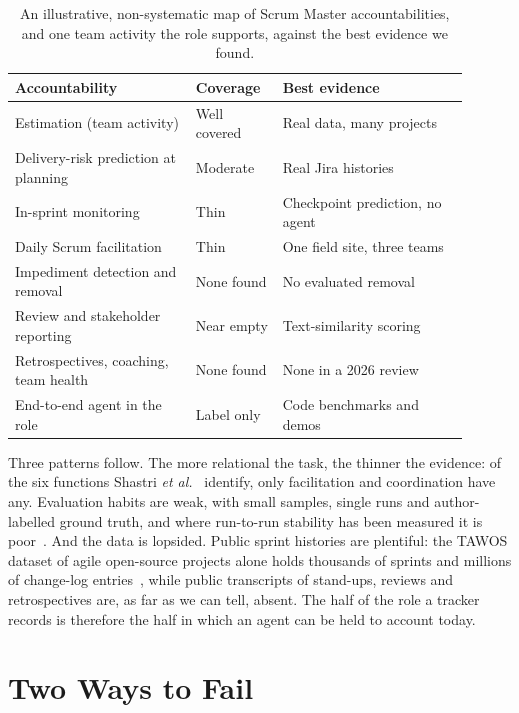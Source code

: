 \documentclass[conference]{IEEEtran}
\begin{document}
\begin{table}[t]
\centering\footnotesize
\caption{An illustrative, non-systematic map of Scrum Master accountabilities, and one team activity the role supports, against the best evidence we found.}
\label{tab:gap}
\setlength{\tabcolsep}{3pt}
\begin{tabular}{>{\raggedright\arraybackslash}p{0.36\linewidth} >{\raggedright\arraybackslash}p{0.17\linewidth} >{\raggedright\arraybackslash}p{0.37\linewidth}}
\hline
Accountability & Coverage & Best evidence\\
\hline
Estimation (team activity) & Well covered & Real data, many projects~\cite{deepse}\\
Delivery-risk prediction at planning & Moderate & Real Jira histories~\cite{tse2018,sprint2vec}\\
In-sprint monitoring & Thin & Checkpoint prediction, no agent~\cite{tse2018}\\
Daily Scrum facilitation & Thin & One field site, three teams~\cite{cabrero}\\
Impediment detection and removal & None found & No evaluated removal\\
Review and stakeholder reporting & Near empty & Text-similarity scoring~\cite{alliata}\\
Retrospectives, coaching, team health & None found & None in a 2026 review~\cite{peras}\\
End-to-end agent in the role & Label only & Code benchmarks and demos~\cite{agilecoder}\\
\hline
\end{tabular}
\end{table}

Three patterns follow. The more relational the task, the thinner the evidence: of the six functions Shastri \emph{et al.}~\cite{shastri} identify, only facilitation and coordination have any. Evaluation habits are weak, with small samples, single runs and author-labelled ground truth, and where run-to-run stability has been measured it is poor~\cite{yoon}. And the data is lopsided. Public sprint histories are plentiful: the TAWOS dataset of agile open-source projects alone holds thousands of sprints and millions of change-log entries~\cite{tawos}, while public transcripts of stand-ups, reviews and retrospectives are, as far as we can tell, absent. The half of the role a tracker records is therefore the half in which an agent can be held to account today.

\section{Two Ways to Fail}
\label{sec:fail}
\end{document}
